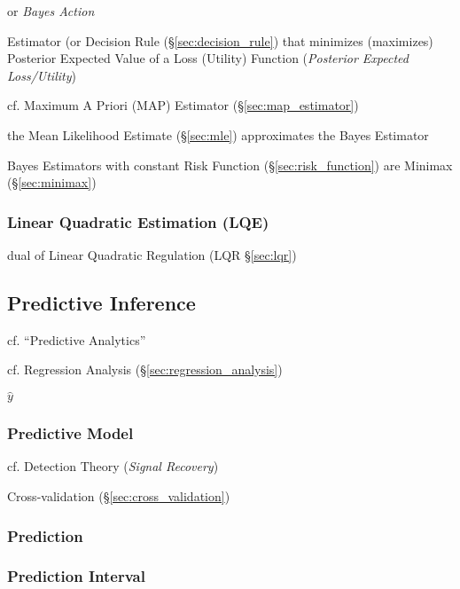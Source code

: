 or \emph{Bayes Action}

Estimator (or Decision Rule (\S\ref{sec:decision_rule}) that minimizes
(maximizes) Posterior Expected Value of a Loss (Utility) Function
(\emph{Posterior Expected Loss/Utility})

cf. Maximum A Priori (MAP) Estimator (\S\ref{sec:map_estimator})

the Mean Likelihood Estimate (\S\ref{sec:mle}) approximates the Bayes Estimator

Bayes Estimators with constant Risk Function (\S\ref{sec:risk_function}) are
Minimax (\S\ref{sec:minimax})



\subsubsection{Linear Quadratic Estimation (LQE)}\label{sec:lqe}

dual of Linear Quadratic Regulation (LQR \S\ref{sec:lqr})



\subsection{Predictive Inference}\label{sec:predictive_inference}

cf. ``Predictive Analytics''

\fist cf. Regression Analysis (\S\ref{sec:regression_analysis})

$\hat{y}$



\subsubsection{Predictive Model}\label{sec:predictive_model}

cf. Detection Theory (\emph{Signal Recovery}) %

Cross-validation (\S\ref{sec:cross_validation})



\subsubsection{Prediction}\label{sec:prediction}

\subsubsection{Prediction Interval}\label{sec:prediction_interval}\hfill

